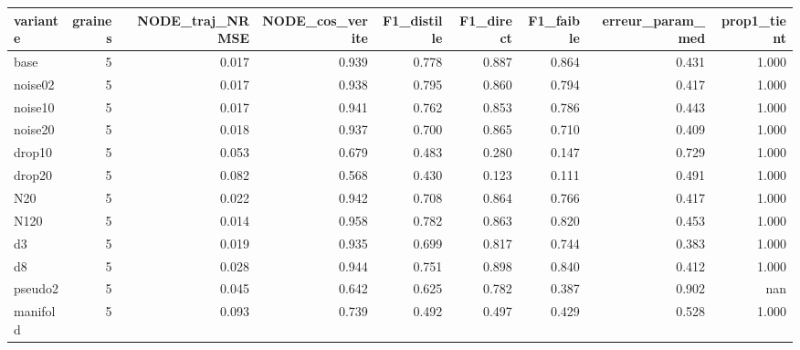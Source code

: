 \begin{tabular}{lrrrrrrrr}
\hline
variante & graines & NODE\_traj\_NRMSE & NODE\_cos\_verite & F1\_distille & F1\_direct & F1\_faible & erreur\_param\_med & prop1\_tient \\
\hline
base & 5 & 0.017 & 0.939 & 0.778 & 0.887 & 0.864 & 0.431 & 1.000 \\
noise02 & 5 & 0.017 & 0.938 & 0.795 & 0.860 & 0.794 & 0.417 & 1.000 \\
noise10 & 5 & 0.017 & 0.941 & 0.762 & 0.853 & 0.786 & 0.443 & 1.000 \\
noise20 & 5 & 0.018 & 0.937 & 0.700 & 0.865 & 0.710 & 0.409 & 1.000 \\
drop10 & 5 & 0.053 & 0.679 & 0.483 & 0.280 & 0.147 & 0.729 & 1.000 \\
drop20 & 5 & 0.082 & 0.568 & 0.430 & 0.123 & 0.111 & 0.491 & 1.000 \\
N20 & 5 & 0.022 & 0.942 & 0.708 & 0.864 & 0.766 & 0.417 & 1.000 \\
N120 & 5 & 0.014 & 0.958 & 0.782 & 0.863 & 0.820 & 0.453 & 1.000 \\
d3 & 5 & 0.019 & 0.935 & 0.699 & 0.817 & 0.744 & 0.383 & 1.000 \\
d8 & 5 & 0.028 & 0.944 & 0.751 & 0.898 & 0.840 & 0.412 & 1.000 \\
pseudo2 & 5 & 0.045 & 0.642 & 0.625 & 0.782 & 0.387 & 0.902 & nan \\
manifold & 5 & 0.093 & 0.739 & 0.492 & 0.497 & 0.429 & 0.528 & 1.000 \\
\hline
\end{tabular}
